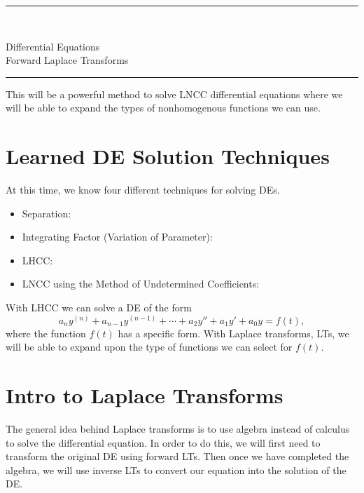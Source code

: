 \documentclass[12pt]{article}
\newcommand{\<}{\langle}
\renewcommand{\>}{\rangle}
\begin{document}
\noindent\rule{7in}{0.4pt}\\
\begin{center}
{\sc Differential Equations\\
Forward Laplace Transforms}
\end{center}
\noindent\rule{7in}{0.4pt}

\noindent  This will be a powerful method to solve LNCC differential equations where we will be able to expand the types of nonhomogenous functions we can use. 

\section*{Learned DE Solution Techniques}

\noindent  At this time, we know four different techniques for solving DEs.
\begin{itemize}
	\item Separation: \vspace{0.25in}
	\item Integrating Factor (Variation of Parameter): \vspace{0.25in}
	\item LHCC: \vspace{0.25in}
	\item LNCC using the Method of Undetermined Coefficients: \vspace{0.25in}
\end{itemize}

\noindent With LHCC we can solve a DE of the form 
\[ a_ny^{(n)} + a_{n-1}y^{(n-1)} + \cdots + a_2y'' + a_1y' + a_0y = f(t),\]
where the function $f(t)$ has a specific form.   With Laplace transforms, LTs, we will be able to expand upon the type of functions we can select for $f(t)$. 


\section*{Intro to Laplace Transforms}

\noindent The general idea behind Laplace transforms is to use algebra instead of calculus to solve the differential equation.  In order to do this, we will first need to transform the original DE using forward LTs.  Then once we have completed the algebra, we will use inverse LTs to convert our equation into the solution of the DE.
\end{document}
